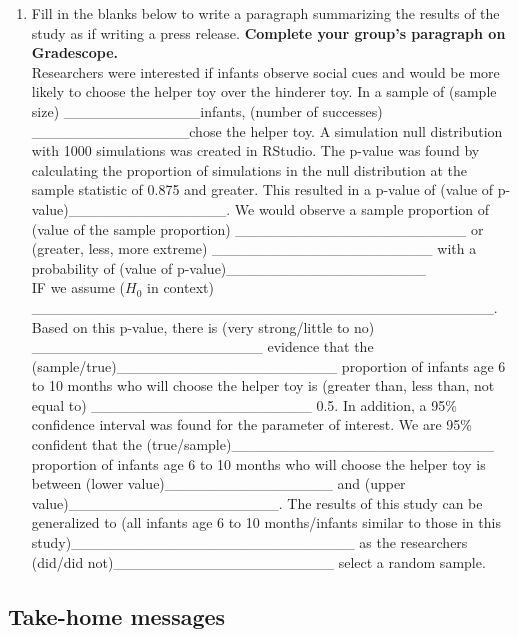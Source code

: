 \documentclass[
]{report}
\providecommand{\tightlist}{%
  \setlength{\itemsep}{0pt}\setlength{\parskip}{0pt}}
\begin{document}
\begin{enumerate}
\def\labelenumi{\arabic{enumi}.}
\setcounter{enumi}{15}
\tightlist
\item
  Fill in the blanks below to write a paragraph summarizing the results of the study as if writing a press release. \textbf{Complete your group's paragraph on Gradescope.}\\
  Researchers were interested if infants observe social cues and would be more likely to choose the helper toy over the hinderer toy. In a sample of (sample size) \_\_\_\_\_\_\_\_\_\_\_\_\_infants, (number of successes) \_\_\_\_\_\_\_\_\_\_\_\_\_\_\_chose the helper toy. A simulation null distribution with 1000 simulations was created in RStudio. The p-value was found by calculating the proportion of simulations in the null distribution at the sample statistic of 0.875 and greater. This resulted in a p-value of (value of p-value)\_\_\_\_\_\_\_\_\_\_\_\_\_\_\_. We would observe a sample proportion of (value of the sample proportion) \_\_\_\_\_\_\_\_\_\_\_\_\_\_\_\_\_\_\_\_\_\_ or (greater, less, more extreme) \_\_\_\_\_\_\_\_\_\_\_\_\_\_\_\_\_\_\_\_\_ with a probability of (value of p-value)\_\_\_\_\_\_\_\_\_\_\_\_\_\_\_\_\_\_\_\\
  IF we assume (\(H_0\) in context) \_\_\_\_\_\_\_\_\_\_\_\_\_\_\_\_\_\_\_\_\_\_\_\_\_\_\_\_\_\_\_\_\_\_\_\_\_\_\_\_\_\_\_\_.
  Based on this p-value, there is (very strong/little to no) \_\_\_\_\_\_\_\_\_\_\_\_\_\_\_\_\_\_\_\_\_\_ evidence that the (sample/true)\_\_\_\_\_\_\_\_\_\_\_\_\_\_\_\_\_\_\_\_\_ proportion of infants age 6 to 10 months who will choose the helper toy is (greater than, less than, not equal to) \_\_\_\_\_\_\_\_\_\_\_\_\_\_\_\_\_\_\_\_\_ 0.5. In addition, a 95\% confidence interval was found for the parameter of interest. We are 95\% confident that the (true/sample)\_\_\_\_\_\_\_\_\_\_\_\_\_\_\_\_\_\_\_\_\_\_\_\_\_ proportion of infants age 6 to 10 months who will choose the helper toy is between (lower value)\_\_\_\_\_\_\_\_\_\_\_\_\_\_\_\_ and (upper value)\_\_\_\_\_\_\_\_\_\_\_\_\_\_\_\_\_\_\_\_. The results of this study can be generalized to (all infants age 6 to 10 months/infants similar to those in this study)\_\_\_\_\_\_\_\_\_\_\_\_\_\_\_\_\_\_\_\_\_\_\_\_\_\_\_ as the researchers (did/did not)\_\_\_\_\_\_\_\_\_\_\_\_\_\_\_\_\_\_\_\_\_ select a random sample.
\end{enumerate}


\hypertarget{take-home-messages-10}{%
\subsection{Take-home messages}\label{take-home-messages-10}}
\end{document}
